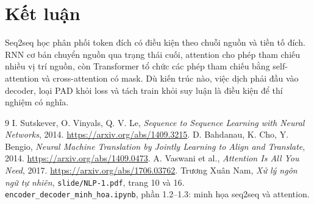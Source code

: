 \documentclass[12pt,a4paper]{article}
\begin{document}
\section{Kết luận}
Seq2seq học phân phối token đích có điều kiện theo chuỗi nguồn và tiền tố đích. RNN cơ bản chuyển nguồn qua trạng thái cuối, attention cho phép tham chiếu nhiều vị trí nguồn, còn Transformer tổ chức các phép tham chiếu bằng self-attention và cross-attention có mask. Dù kiến trúc nào, việc dịch phải đầu vào decoder, loại PAD khỏi loss và tách train khỏi suy luận là điều kiện để thí nghiệm có nghĩa.

\begin{thebibliography}{9}
 I. Sutskever, O. Vinyals, Q. V. Le, \emph{Sequence to Sequence Learning with Neural Networks}, 2014. \url{https://arxiv.org/abs/1409.3215}.
 D. Bahdanau, K. Cho, Y. Bengio, \emph{Neural Machine Translation by Jointly Learning to Align and Translate}, 2014. \url{https://arxiv.org/abs/1409.0473}.
 A. Vaswani et al., \emph{Attention Is All You Need}, 2017. \url{https://arxiv.org/abs/1706.03762}.
 Trương Xuân Nam, \emph{Xử lý ngôn ngữ tự nhiên}, \texttt{slide/NLP-1.pdf}, trang 10 và 16.
 \texttt{encoder\_decoder\_minh\_hoa.ipynb}, phần 1.2--1.3: minh họa seq2seq và attention.
\end{thebibliography}
\end{document}
